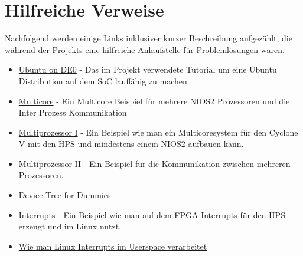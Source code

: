 \chapter{Hilfreiche Verweise}
Nachfolgend werden einige Links inklusiver kurzer Beschreibung aufgezählt, die während der Projekts eine hilfreiche Anlaufstelle für Problemlösungen waren.
\begin{itemize}
	\item \href{https://eewiki.net/display/linuxonarm/DE0-Nano-SoC+Kit}{Ubuntu on DE0} - Das im Projekt verwendete Tutorial um eine Ubuntu Distribution auf dem \ac{SoC} lauffähig zu machen.
	\item \href{https://www.altera.com/support/support-resources/design-examples/intellectual-property/embedded/nios-ii/exm-multi-nios2-hardware.html}{Multicore} - Ein Multicore Beispiel für mehrere NIOS2 Prozessoren und die Inter Prozess Kommunikation
	\item \href{https://rocketboards.org/foswiki/view/Documentation/BuildingMultiProcessorSystems}{Multiprozessor I} - Ein Beispiel wie man ein Multicoresystem für den Cyclone V mit den \ac{HPS} und mindestens einem NIOS2 aufbauen kann.
	\item \href{https://rocketboards.org/foswiki/view/Documentation/DatamoverDesignExample}{Multiprozessor II} - Ein Beispiel für die Kommunikation zwischen mehreren Prozessoren.
	\item \href{http://elinux.org/images/f/f9/Petazzoni-device-tree-dummies_0.pdf}{Device Tree for Dummies}
	\item \href{https://zhehaomao.com/blog/fpga/2014/05/24/sockit-10.html}{Interrupts} - Ein Beispiel wie man auf dem \ac{FPGA} Interrupts für den \ac{HPS} erzeugt und im Linux nutzt.
	\item \href{https://yurovsky.github.io/2014/10/10/linux-uio-gpio-interrupt/}{Wie man Linux Interrupts im Userspace verarbeitet}
 \end{itemize}